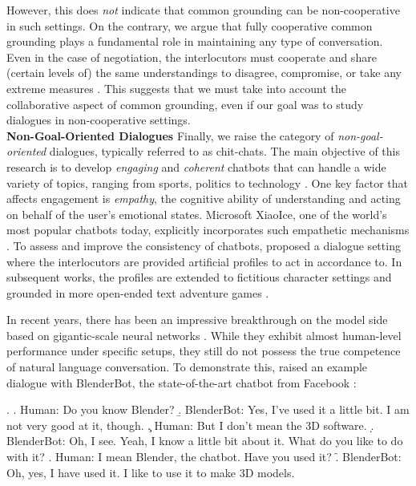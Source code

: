 However, this does \textit{not} indicate that common grounding can be non-cooperative in such settings. On the contrary, we argue that fully cooperative common grounding plays a fundamental role in maintaining any type of conversation. Even in the case of negotiation, the interlocutors must cooperate and share (certain levels of) the same understandings to disagree, compromise, or take any extreme measures \citep{lewis1969convention,sacks1987preferences}. This suggests that we must take into account the collaborative aspect of common grounding, even if our goal was to study dialogues in non-cooperative settings.
\\


\noindent
\textbf{Non-Goal-Oriented Dialogues}\quad
Finally, we raise the category of \textit{non-goal-oriented} dialogues, typically referred to as chit-chats. The main objective of this research is to develop \textit{engaging} and \textit{coherent} chatbots that can handle a wide variety of topics, ranging from sports, politics to technology \citep{ram2018conversational}. One key factor that affects engagement is \textit{empathy}, the cognitive ability of understanding and acting on behalf of the user's emotional states. Microsoft XiaoIce, one of the world's most popular chatbots today, explicitly incorporates such empathetic mechanisms \citep{zhou2020design}. To assess and improve the consistency of chatbots, \citet{zhang-etal-2018-personalizing} proposed a dialogue setting where the interlocutors are provided artificial profiles to act in accordance to. In subsequent works, the profiles are extended to fictitious character settings and grounded in more open-ended text adventure games \citep{urbanek-etal-2019-learning}.

In recent years, there has been an impressive breakthrough on the model side based on gigantic-scale neural networks \citep{adiwardana2020towards,roller-etal-2021-recipes}. While they exhibit almost human-level performance under specific setups, they still do not possess the true competence of natural language conversation. To demonstrate this, \citet{benotti-blackburn-2021-grounding} raised an example dialogue with BlenderBot, the state-of-the-art chatbot from Facebook \citep{smith-etal-2020-put,roller-etal-2021-recipes}:

\ex.
\a. Human:\; Do you know Blender?
\b. BlenderBot:\; Yes, I've used it a little bit. I am not very good at it, though.
\c. Human:\; But I don't mean the 3D software.
\d. BlenderBot:\;  Oh, I see. Yeah, I know a little bit about it. What do you like to do with it?
\e. Human:\; I mean Blender, the chatbot. Have you used it?
\f. BlenderBot:\; Oh, yes, I have used it. I like to use it to make 3D models.

